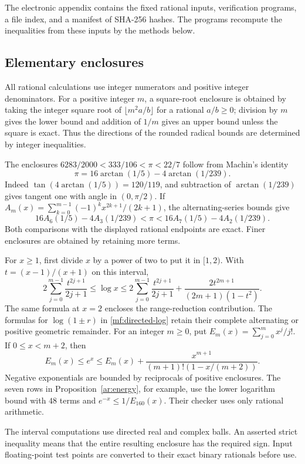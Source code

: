 \documentclass[11pt,reqno]{amsart}
\numberwithin{equation}{section}
\theoremstyle{definition}
\theoremstyle{remark}
\begin{document}
The electronic appendix contains the fixed rational inputs, verification
programs, a file index, and a manifest of SHA-256 hashes. The programs
recompute the inequalities from these inputs by the methods below.

\subsection{Elementary enclosures}

All rational calculations use integer numerators and positive integer
denominators. For a positive integer $m$, a square-root enclosure is
obtained by taking the integer square root of $\lfloor m^2a/b\rfloor$
for a rational $a/b\ge0$;
division by $m$ gives the lower bound and addition of $1/m$ gives
an upper bound unless the square is exact. Thus the directions of
the rounded radical bounds are determined by integer inequalities.

The enclosures $6283/2000<333/106<\pi<22/7$ follow from Machin's identity
\[
 \pi=16\arctan(1/5)-4\arctan(1/239).
\]
Indeed $\tan(4\arctan(1/5))=120/119$, and subtraction of
$\arctan(1/239)$ gives tangent one with angle in $(0,\pi/2)$.
If $A_m(x)=\sum_{k=0}^{m-1}(-1)^kx^{2k+1}/(2k+1)$, the
alternating-series bounds give
\[
 16A_6(1/5)-4A_3(1/239)<\pi
 <16A_7(1/5)-4A_2(1/239).
\]
Both comparisons with the displayed rational endpoints are exact.
Finer enclosures are obtained by retaining more terms.

For $x\ge1$, first divide $x$ by a power of two to put it in $[1,2)$.
With $t=(x-1)/(x+1)$ on this interval,
\[
 2\sum_{j=0}^{m-1}\frac{t^{2j+1}}{2j+1}
 \le\log x
 \le2\sum_{j=0}^{m-1}\frac{t^{2j+1}}{2j+1}
       +\frac{2t^{2m+1}}{(2m+1)(1-t^2)}.
\]
The same formula at $x=2$ encloses the range-reduction contribution.
The formulas for $\log(1\pm r)$ in
\eqref{mf:directed-log} retain their complete alternating or
positive geometric remainder. For an integer $m\ge0$, put
$E_m(x)=\sum_{j=0}^m x^j/j!$. If $0\le x<m+2$, then
\begin{equation}\label{ce:exp}
 E_m(x)\le e^x\le E_m(x)
                +\frac{x^{m+1}}{(m+1)!(1-x/(m+2))}.
\end{equation}
Negative exponentials are bounded by reciprocals of positive
enclosures. The seven rows in Proposition~\ref{ar:energy}, for
example, use the lower logarithm bound with $48$ terms and
$e^{-x}\le1/E_{160}(x)$. Their checker uses only rational arithmetic.

The interval computations use directed real and complex balls.
An asserted strict inequality means that the entire resulting
enclosure has the required sign. Input floating-point test points are converted to
their exact binary rationals before use.
\end{document}
